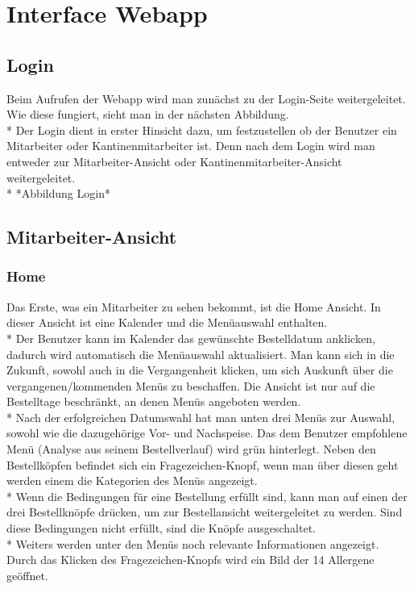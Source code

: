 \section {Interface Webapp}
\author{Benjamin Besic}
\subsection{Login}
Beim Aufrufen der Webapp wird man zunächst zu der Login-Seite weitergeleitet. Wie diese fungiert, sieht man in der nächsten Abbildung. \\*
Der Login dient in erster Hinsicht dazu, um festzustellen ob der Benutzer ein Mitarbeiter oder Kantinenmitarbeiter ist.
Denn nach dem Login wird man entweder zur Mitarbeiter-Ansicht oder Kantinenmitarbeiter-Ansicht weitergeleitet. \\*
*Abbildung Login*

\subsection {Mitarbeiter-Ansicht}

\subsubsection {Home}
\label{sec:MitHome}
Das Erste, was ein Mitarbeiter zu sehen bekommt, ist die Home Ansicht. In dieser Ansicht ist eine Kalender und die Menüauswahl enthalten. \\*
Der Benutzer kann im Kalender das gewünschte Bestelldatum anklicken, dadurch wird automatisch die Menüauswahl aktualisiert. Man kann sich in die Zukunft, sowohl auch 
in die Vergangenheit klicken, um sich Auskunft über die vergangenen/kommenden Menüs zu beschaffen. Die Ansicht ist nur auf die Bestelltage beschränkt, an denen Menüs angeboten werden.\\*
Nach der erfolgreichen Datumswahl hat man unten drei Menüs zur Auswahl, sowohl wie die dazugehörige Vor- und Nachspeise. Das dem Benutzer empfohlene Menü (Analyse aus seinem Bestellverlauf) wird grün hinterlegt.
Neben den Bestellköpfen befindet sich ein Fragezeichen-Knopf, wenn man über diesen geht werden einem die Kategorien des Menüs angezeigt.
\\* Wenn die Bedingungen für eine Bestellung erfüllt sind,
kann man auf einen der drei Bestellknöpfe drücken, um zur Bestellansicht weitergeleitet zu werden. Sind diese Bedingungen nicht erfüllt, sind die Knöpfe ausgeschaltet. \\*
Weiters werden unter den Menüs noch relevante Informationen angezeigt. Durch das Klicken des Fragezeichen-Knopfs wird ein Bild der 14 Allergene geöffnet.

